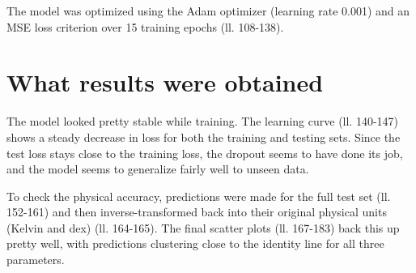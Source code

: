 \documentclass[11pt,a4paper]{article}
\begin{document}
The model was optimized using the Adam optimizer (learning rate 0.001) and an MSE loss criterion over 15 training epochs (ll. 108-138). 

\section*{What results were obtained}
The model looked pretty stable while training. The learning curve (ll. 140-147) shows a steady decrease in loss for both the training and testing sets. Since the test loss stays close to the training loss, the dropout seems to have done its job, and the model seems to generalize fairly well to unseen data.

To check the physical accuracy, predictions were made for the full test set (ll. 152-161) and then inverse-transformed back into their original physical units (Kelvin and dex) (ll. 164-165). The final scatter plots (ll. 167-183) back this up pretty well, with predictions clustering close to the identity line for all three parameters.
\end{document}

